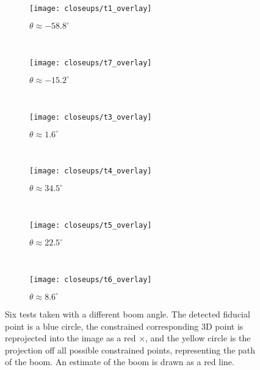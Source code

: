 \documentclass[letterpaper, 10 pt, conference]{ieeeconf}  %
\begin{document}
\begin{figure*}[htbp]
        \centering
         \begin{subfigure}[b]{0.3\textwidth}
                \texttt{[image: closeups/t1\_overlay]}
                \caption{$\theta \approx -58.8^\circ$}
                \label{fig:t1}
        \end{subfigure}
        ~
        \begin{subfigure}[b]{0.3\textwidth}
                \texttt{[image: closeups/t7\_overlay]}
                \caption{$\theta \approx -15.2^\circ$}
                \label{fig:t2}
        \end{subfigure}
        ~
        \begin{subfigure}[b]{0.3\textwidth}
                \texttt{[image: closeups/t3\_overlay]}
                \caption{$\theta \approx 1.6^\circ$}
                \label{fig:t3}
        \end{subfigure}
		\\
		\begin{subfigure}[b]{0.3\textwidth}
                \texttt{[image: closeups/t4\_overlay]}
                \caption{$\theta \approx 34.5^\circ$}
                \label{fig:t4}
        \end{subfigure}
        ~
        \begin{subfigure}[b]{0.3\textwidth}
                \texttt{[image: closeups/t5\_overlay]}
                \caption{$\theta \approx 22.5^\circ$}
                \label{fig:t5}
        \end{subfigure}
        ~
        \begin{subfigure}[b]{0.3\textwidth}
                \texttt{[image: closeups/t6\_overlay]}
                \caption{$\theta \approx 8.6^\circ$}
                \label{fig:t6}
        \end{subfigure}
        
        \caption{Six tests taken with a different boom angle. The detected fiducial point is a blue circle, the constrained corresponding 3D point is reprojected into the image as a red $\times$, and the yellow circle is the projection off all possible constrained points, representing the path of the boom. An estimate of the boom is drawn as a red line.}
        \label{fig:results}
\end{figure*}
\end{document}
